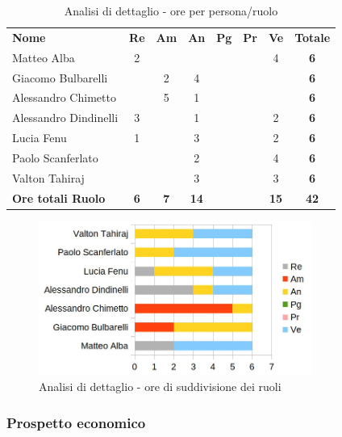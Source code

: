 		\begin{table} [h!]
			\begin{center}
				\begin{tabular} { m{3.5cm} c c c c c c c }
					\rowcolor{lightgray}
					\textbf{Nome} & \textbf{Re} & \textbf{Am} & \textbf{An} & \textbf{Pg} & \textbf{Pr} & \textbf{Ve} & \textbf{Totale} \\
					Matteo Alba & 2 & & & & & 4 & \textbf{6} \\
					Giacomo Bulbarelli & & 2 & 4 & & & & \textbf{6} \\
					Alessandro Chimetto & & 5 & 1 & & & & \textbf{6} \\
					Alessandro Dindinelli & 3 & & 1 & & & 2 & \textbf{6} \\
					Lucia Fenu & 1 & & 3 & & & 2 & \textbf{6} \\
					Paolo Scanferlato & & & 2 & & & 4 & \textbf{6} \\
					Valton Tahiraj & & & 3 & & & 3 & \textbf{6} \\
					\textbf{Ore totali Ruolo} & \textbf{6} & \textbf{7} & \textbf{14} & \textbf{} & \textbf{}& \textbf{15} & \textbf{42}
				\end{tabular}
				\caption{Analisi di dettaglio - ore per persona/ruolo}
			\end{center}
		\end{table}
	
		\begin{figure} [h!]
			\centering
			\includegraphics[width=0.8\textwidth]{res/img/grafici/consolidamento_dei_requisiti_ore_ruolo.jpg}
			\caption{Analisi di dettaglio - ore di suddivisione dei ruoli} 
		\end{figure}
		
	\newpage

	\subsubsection{Prospetto economico}
	

